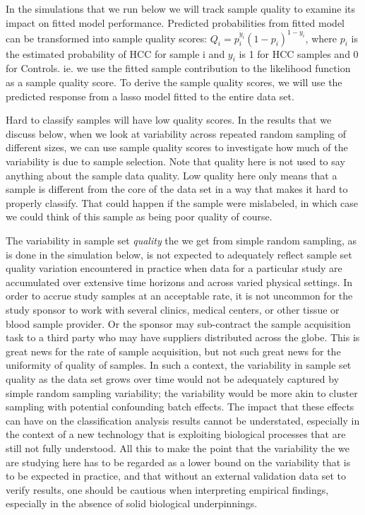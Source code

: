 \documentclass[
]{book}
\begin{document}
In the simulations that we run below we will track sample quality
to examine its impact on fitted model performance.
Predicted probabilities from fitted model can be transformed into sample
quality scores: \(Q_i = p_i^{y_i}(1-p_i)^{1-y_i}\), where \(p_i\) is the
estimated probability of HCC for sample i and \(y_i\) is 1 for HCC samples and
0 for Controls. ie. we use the fitted sample contribution to the
likelihood function as a sample quality score. To derive the sample quality scores,
we will use the predicted response from a lasso model fitted to the entire data set.

Hard to classify samples will have low quality scores.
In the results that we discuss below, when we look at variability across repeated
random sampling of different sizes, we can use sample quality scores to investigate
how much of the variability is due to sample selection.
Note that quality here is not used to say anything about the sample data quality.
Low quality here only means that a sample is different from the
core of the data set in a way that makes it hard to properly classify.
That could happen if the sample were mislabeled, in which case we could
think of this sample as being poor quality of course.

The variability in sample set \emph{quality} the we get from simple random sampling,
as is done in the simulation below, is not expected to adequately reflect
sample set quality variation encountered in practice when data for a particular
study are accumulated over extensive time horizons and across varied
physical settings. In order to accrue study samples at an acceptable rate,
it is not uncommon for the study sponsor to work with several clinics, medical centers,
or other tissue or blood sample provider. Or the sponsor may sub-contract the sample acquisition
task to a third party who may have suppliers distributed across the globe. This
is great news for the rate of sample acquisition, but not such great news for
the uniformity of quality of samples. In such a context, the variability
in sample set quality as the data set grows over time would not
be adequately captured by simple random sampling variability;
the variability would be more akin to cluster sampling with potential confounding
batch effects. The impact that these effects can have on the classification analysis
results cannot be understated, especially in the context of a new technology that
is exploiting biological processes that are still not fully understood. All this
to make the point that the variability the we are studying here has to be regarded
as a lower bound on the variability that is to be expected in practice, and that without
an external validation data set to verify results, one should be cautious
when interpreting empirical findings, especially in the absence of solid
biological underpinnings.
\end{document}
